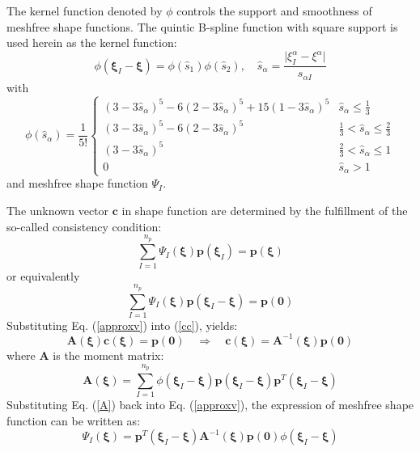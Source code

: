The kernel function denoted by $\phi$ controls the support and smoothness of meshfree shape functions. The quintic B-spline function with square support is used herein as the kernel function:
\begin{equation}
\phi(\boldsymbol \xi_I - \boldsymbol \xi) = \phi(\hat s_1)\phi(\hat s_2), \quad \hat s_\alpha = \frac{\vert \xi^\alpha_I - \xi^\alpha\vert}{s_{\alpha I}}
\end{equation}
with
\begin{equation}
\phi(\hat s_\alpha) = \frac{1}{5!}\begin{cases}
(3-3\hat s_\alpha)^5 - 6(2-3\hat s_\alpha)^5 + 15(1-3\hat s_\alpha)^5 & \hat s_\alpha \le \frac{1}{3} \\
(3-3\hat s_\alpha)^5 - 6(2-3\hat s_\alpha)^5 & \frac{1}{3}<\hat s_\alpha \le \frac{2}{3} \\
(3-3\hat s_\alpha)^5 & \frac{2}{3}<\hat s_\alpha \le 1 \\
0 & \hat s_\alpha >1
\end{cases}
\end{equation}
and \DIFdelbegin {}\DIFdelend \DIFaddbegin {}\DIFaddend meshfree shape function $\Psi_I$.

The unknown vector $\boldsymbol c$ in shape function are determined by the fulfillment of the so-called consistency condition:
\begin{equation}
\sum_{I=1}^{n_p} \Psi_I(\boldsymbol \xi)\boldsymbol p(\boldsymbol \xi_I) = \boldsymbol p(\boldsymbol \xi)
\end{equation}
or equivalently
\begin{equation}\label{cc}
\sum_{I=1}^{n_p} \Psi_I(\boldsymbol \xi)\boldsymbol p(\boldsymbol \xi_I-\boldsymbol \xi) = \boldsymbol p(\boldsymbol 0)
\end{equation}
Substituting Eq. (\ref{approxv}) into (\ref{cc}), yields:
\begin{equation}\label{A}
\boldsymbol A(\boldsymbol \xi) \boldsymbol c(\boldsymbol \xi) = \boldsymbol p(\boldsymbol 0)\quad \Rightarrow \quad
\boldsymbol c(\boldsymbol \xi) = \boldsymbol A^{-1}(\boldsymbol \xi)\boldsymbol p(\boldsymbol 0)
\end{equation}
where $\boldsymbol A$ is the moment matrix:
\begin{equation}
\boldsymbol A(\boldsymbol \xi) = \sum_{I=1}^{n_p}\phi(\boldsymbol \xi_I - \boldsymbol \xi) \boldsymbol p(\boldsymbol \xi_I-\boldsymbol \xi)\boldsymbol p^T(\boldsymbol \xi_I - \boldsymbol \xi)
\end{equation}
Substituting Eq. (\ref{A}) back into Eq. (\ref{approxv}), the expression of meshfree shape function can be written as:
\begin{equation}
\Psi_I(\boldsymbol \xi) = \boldsymbol p^T(\boldsymbol \xi_I - \boldsymbol \xi)\boldsymbol A^{-1}(\boldsymbol \xi) \boldsymbol p(\boldsymbol 0) \phi(\boldsymbol \xi_I-\boldsymbol \xi)
\end{equation}

